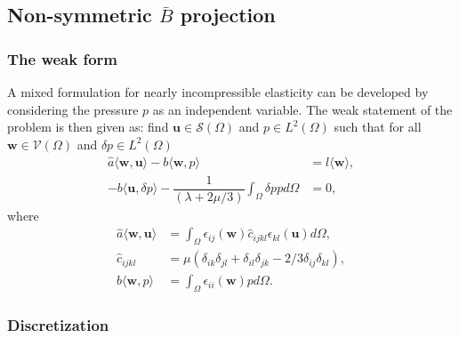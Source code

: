 \subsection{Non-symmetric \Bezier $\bar{B}$ projection}
\subsubsection{The weak form}
{A mixed formulation for nearly incompressible elasticity can be developed by considering the pressure $p$ as an independent variable. The weak statement of the problem is then given as: find $\mathbf{u}\in{\mathcal{S}(\Omega)}$ and $p\in{L}^2(\Omega)$ such that for all $\mathbf{w}\in{\mathcal{V}(\Omega)}$ and $\delta{p}\in{L}^2(\Omega)$}
\begin{align}
    \hat{a}\langle{\mathbf{w},\mathbf{u}}\rangle-b\langle{\mathbf{w},p}\rangle                        & =l\langle{\mathbf{w}}\rangle, \\
    - b\langle{\mathbf{u},\delta{p}}\rangle-\dfrac{1}{(\lambda+2\mu/3)}\int_{\Omega}\delta{p}pd\Omega & =0,
\end{align}
where
\begin{align}
    \hat{a}\langle{\mathbf{w},\mathbf{u}}\rangle & =\int_{\Omega}\epsilon_{ij}(\mathbf{w})\hat{c}_{ijkl}\epsilon_{kl}(\mathbf{u})d\Omega,    \\
    \hat{c}_{ijkl}                               & =\mu\left(\delta_{ik}\delta_{jl}+\delta_{il}\delta_{jk}-2/3\delta_{ij}\delta_{kl}\right), \\
    b\langle{\mathbf{w},p}\rangle                & =\int_{\Omega}\epsilon_{ii}(\mathbf{w})pd\Omega.
\end{align}

\subsubsection{{Discretization}}

